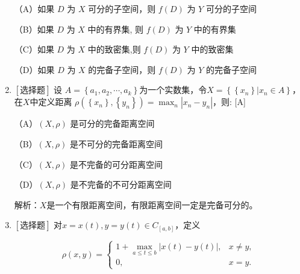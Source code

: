 \documentclass{article}
\begin{document}
\begin{enumerate}
    \begin{minipage}[t]{0.45\linewidth}
    （A）如果 $D$ 为 $X$ 可分的子空间，则 $f(D)$ 为 $Y$ 可分的子空间
    \end{minipage}
    \hfill
    \begin{minipage}[t]{0.45\linewidth}
    （B）如果 $D$ 为 $X$ 中的有界集, 则 $f(D)$ 为 $Y$ 中的有界集
    \end{minipage}
    \begin{minipage}[t]{0.45\linewidth}
    （C）如果 $D$ 为 $X$ 中的致密集,则 $f(D)$ 为 $Y$ 中的致密集
    \end{minipage}
    \hfill
    \begin{minipage}[t]{0.45\linewidth}
    （D）如果 $D$ 为 $X$ 的完备子空间，则 $f(D)$ 为 $Y$ 的完备子空间
    \end{minipage}

    \item $\left[\textbf{选择题}\right]$ 设 $A=\left\{a_1,a_2,\cdots,a_k\right\}$为一个实数集，令$X=\left\{\left\{x_n\right\}|x_n\in A\right\}$，在$X$中定义距离 $\rho\left(\left\{x_n\right\},\left\{y_n\right\}\right)=\max _n\left|x_n-y_n\right|$，则: \hfill [A]

    \begin{minipage}[t]{0.45\linewidth}
    （A）$(X, \rho)$ 是可分的完备距离空间
    \end{minipage}
    \hfill
    \begin{minipage}[t]{0.45\linewidth}
    （B）$(X, \rho)$ 是不可分的完备距离空间
    \end{minipage}
    \begin{minipage}[t]{0.45\linewidth}
    （C）$(X, \rho)$ 是不完备的可分距离空间
    \end{minipage}
    \hfill
    \begin{minipage}[t]{0.45\linewidth}
    （D）$(X, \rho)$ 是不完备的不可分距离空间
    \end{minipage}

    解析：$X$是一个有限距离空间，有限距离空间一定是完备可分的。

    \item $\left[\textbf{选择题}\right]$ 对$x=x\left(t\right),y=y\left(t\right)\in C_{[a,b]}$，定义

    $$
    \rho(x, y)=\left\{\begin{array}{cc}
    1 + \max_{a\leq t\leq b}\left|x(t)-y(t)\right|, & x \neq y, \\
    0, & x = y .
    \end{array}\right.
    $$
    

\end{enumerate}
\end{document}
